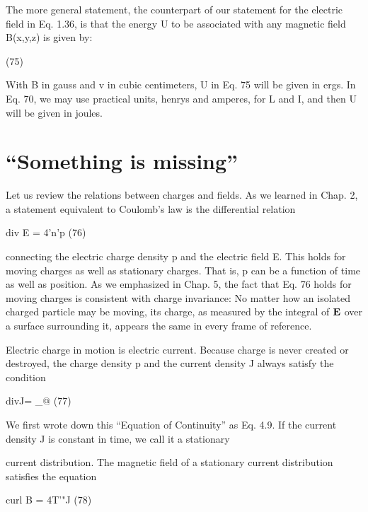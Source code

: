 The more general statement, the counterpart of our statement for
the electric field in Eq. 1.36, is that the energy U to be associated with
any magnetic field B(x,y,z) is given by:

\begin{equation}
\end{equation}
(75)

 

With B in gauss and v in cubic centimeters, U in Eq. 75 will be given
in ergs. In Eq. 70, we may use practical units, henrys and amperes,
for L and I, and then U will be given in joules.

\section{``Something is missing''}

Let us review the relations between charges and fields. As we
learned in Chap. 2, a statement equivalent to Coulomb's law is the
differential relation

\begin{equation}
\end{equation}
div E = 4'n'p (76)

connecting the electric charge density p and the electric field E. This
holds for moving charges as well as stationary charges. That is, p can
be a function of time as well as position. As we emphasized in
Chap. 5, the fact that Eq. 76 holds for moving charges is consistent
with charge invariance: No matter how an isolated charged particle
may be moving, its charge, as measured by the integral of $\mathbf{E}$ over a
surface surrounding it, appears the same in every frame of reference.

Electric charge in motion is electric current. Because charge is
never created or destroyed, the charge density p and the current
density J always satisfy the condition

\begin{equation}
\end{equation}
divJ= _@ (77)

We first wrote down this ``Equation of Continuity'' as Eq. 4.9.
If the current density J is constant in time, we call it a stationary

current distribution. The magnetic field of a stationary current distribution
satisfies the equation

\begin{equation}
\end{equation}
curl B = 4T'"J (78)

